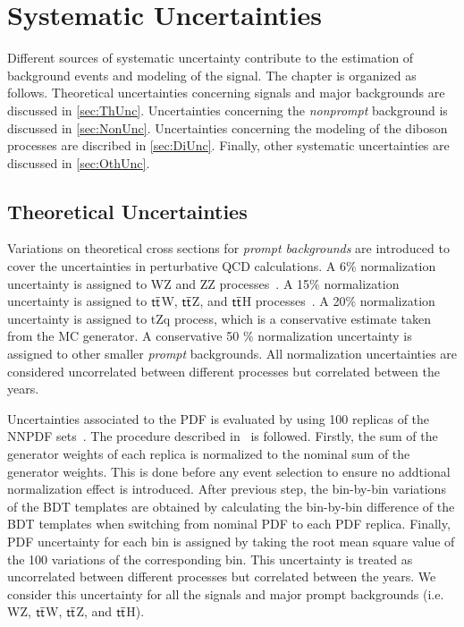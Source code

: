 \chapter{Systematic Uncertainties}
\label{chap:Systematics}

Different sources of systematic uncertainty contribute to the estimation of background events and modeling of the signal. The chapter is organized as follows. Theoretical uncertainties concerning signals and major backgrounds are discussed in \autoref{sec:ThUnc}. Uncertainties concerning the \emph{nonprompt} background is discussed in \autoref{sec:NonUnc}. Uncertainties concerning the modeling of the diboson processes are discribed in \autoref{sec:DiUnc}. Finally, other systematic uncertainties are discussed in \autoref{sec:OthUnc}.

\section{Theoretical Uncertainties}
\label{sec:ThUnc}

Variations on theoretical cross sections for \emph{prompt backgrounds} are introduced to cover the uncertainties in perturbative \ac{QCD} calculations.  A 6$\%$ normalization uncertainty is assigned to WZ and ZZ processes~\cite{Campbell:2011bn}. A 15$\%$ normalization uncertainty is assigned to $\textsf{t}\overline{\textsf{t}}$W, $\textsf{t}\overline{\textsf{t}}$Z, and $\textsf{t}\overline{\textsf{t}}$H processes~\cite{Frederix:2021agh,Kulesza:2020nfh}. A 20$\%$ normalization uncertainty is assigned to tZq process, which is a conservative estimate taken from the MC generator. A conservative 50 $\%$ normalization uncertainty is assigned to other smaller \emph{prompt} backgrounds. All normalization uncertainties are considered uncorrelated between different processes but correlated between the years. 

Uncertainties associated to the \ac{PDF} is evaluated by using 100 replicas of the NNPDF sets~\cite{NNPDF:2014otw,NNPDF:2017mvq}. The procedure described in~\cite{CMS:2012nsv} is followed. Firstly, the sum of the generator weights of each replica is normalized to the nominal sum of the generator weights. This is done before any event selection to ensure no addtional normalization effect is introduced. After previous step, the bin-by-bin variations of the BDT templates are obtained by calculating the bin-by-bin difference of the BDT templates when switching from nominal PDF to each PDF replica. Finally, PDF uncertainty for each bin is assigned by taking the root mean square value of the 100 variations of the corresponding bin. This uncertainty is treated as uncorrelated between different processes but correlated between the years.  We consider this uncertainty for all the signals and major prompt backgrounds (i.e. WZ, $\textsf{t}\overline{\textsf{t}}$W, $\textsf{t}\overline{\textsf{t}}$Z, and $\textsf{t}\overline{\textsf{t}}$H).

